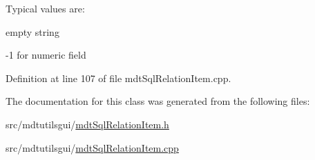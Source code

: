 Typical values are\-:
\begin{DoxyItemize}
\item empty string
\item -\/1 for numeric field 
\end{DoxyItemize}

Definition at line 107 of file mdt\-Sql\-Relation\-Item.\-cpp.



The documentation for this class was generated from the following files\-:\begin{DoxyCompactItemize}
\item 
src/mdtutilsgui/\hyperlink{mdt_sql_relation_item_8h}{mdt\-Sql\-Relation\-Item.\-h}\item 
src/mdtutilsgui/\hyperlink{mdt_sql_relation_item_8cpp}{mdt\-Sql\-Relation\-Item.\-cpp}\end{DoxyCompactItemize}
